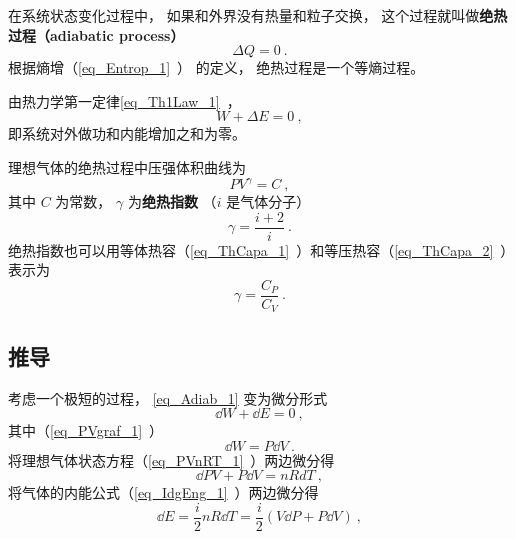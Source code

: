 

在系统状态变化过程中， 如果和外界没有热量和粒子交换， 这个过程就叫做\textbf{绝热过程（adiabatic process）}
\begin{equation}
\Delta Q = 0~.
\end{equation}
根据熵增（\autoref{eq_Entrop_1}~） 的定义， 绝热过程是一个等熵过程。

由热力学第一定律\autoref{eq_Th1Law_1}~，
\begin{equation}\label{eq_Adiab_1}
W + \Delta E = 0~,
\end{equation}
即系统对外做功和内能增加之和为零。

理想气体的绝热过程中压强体积曲线为
\begin{equation}\label{eq_Adiab_5}
P V^\gamma = C~,
\end{equation}
其中 $C$ 为常数， $\gamma$ 为\textbf{绝热指数} （$i$ 是气体分子）
\begin{equation}
\gamma = \frac{i+2}{i}~.
\end{equation}
绝热指数也可以用等体热容（\autoref{eq_ThCapa_1}~）和等压热容（\autoref{eq_ThCapa_2}~）表示为
\begin{equation}
\gamma = \frac{C_P}{C_V}~.
\end{equation}


\subsection{推导}
考虑一个极短的过程， \autoref{eq_Adiab_1} 变为微分形式
\begin{equation}\label{eq_Adiab_4}
\dd{W} + \dd{E} = 0~,
\end{equation}
其中（\autoref{eq_PVgraf_1}~）
\begin{equation}\label{eq_Adiab_2}
\dd{W} = P\dd{V}~.
\end{equation}
将理想气体状态方程（\autoref{eq_PVnRT_1}~）两边微分得
\begin{equation}
\dd{P}V + P\dd{V} = nRdT~,
\end{equation}
将气体的内能公式（\autoref{eq_IdgEng_1}~）两边微分得
\begin{equation}\label{eq_Adiab_3}
\dd{E} = \frac{i}{2}n R\dd{T} = \frac{i}{2} (V\dd{P} + P\dd{V})~,
\end{equation}


